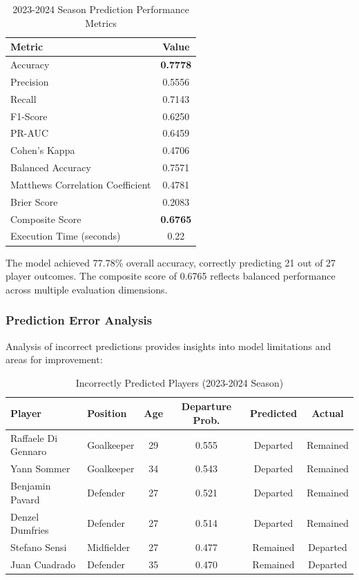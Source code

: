\begin{table}[H]
\centering
\caption{2023-2024 Season Prediction Performance Metrics}
\label{tab:prediction_metrics_2023_2024}
\begin{tabular}{lc}
\toprule
\textbf{Metric} & \textbf{Value} \\
\midrule
Accuracy & \textbf{0.7778} \\
Precision & 0.5556 \\
Recall & 0.7143 \\
F1-Score & 0.6250 \\
PR-AUC & 0.6459 \\
Cohen's Kappa & 0.4706 \\
Balanced Accuracy & 0.7571 \\
Matthews Correlation Coefficient & 0.4781 \\
Brier Score & 0.2083 \\
\midrule
Composite Score & \textbf{0.6765} \\
Execution Time (seconds) & 0.22 \\
\bottomrule
\end{tabular}
\end{table}

The model achieved 77.78\% overall accuracy, correctly predicting 21 out of 27 player outcomes. The composite score of 0.6765 reflects balanced performance across multiple evaluation dimensions.

\subsubsection{Prediction Error Analysis}

Analysis of incorrect predictions provides insights into model limitations and areas for improvement:

\begin{table}[H]
\centering
\caption{Incorrectly Predicted Players (2023-2024 Season)}
\label{tab:prediction_errors_2023_2024}
\begin{tabular}{llcccc}
\toprule
\textbf{Player} & \textbf{Position} & \textbf{Age} & \textbf{Departure Prob.} & \textbf{Predicted} & \textbf{Actual} \\
\midrule
Raffaele Di Gennaro & Goalkeeper & 29 & 0.555 & Departed & Remained \\
Yann Sommer & Goalkeeper & 34 & 0.543 & Departed & Remained \\
Benjamin Pavard & Defender & 27 & 0.521 & Departed & Remained \\
Denzel Dumfries & Defender & 27 & 0.514 & Departed & Remained \\
Stefano Sensi & Midfielder & 27 & 0.477 & Remained & Departed \\
Juan Cuadrado & Defender & 35 & 0.470 & Remained & Departed \\
\bottomrule
\end{tabular}
\end{table}

